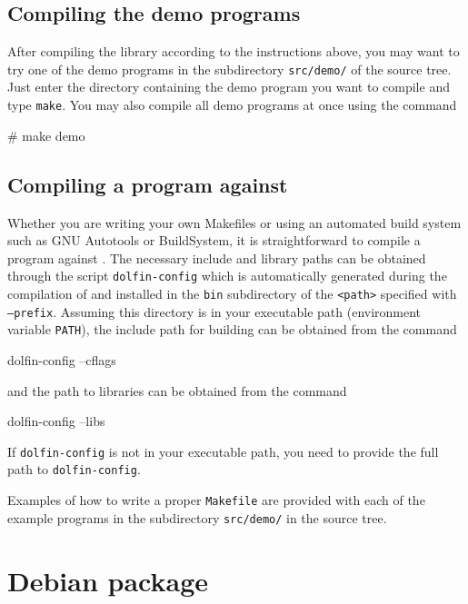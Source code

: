 \subsection{Compiling the demo programs}

After compiling the \dolfin{} library according to the instructions
above, you may want to try one of the demo programs in the
subdirectory \texttt{src/demo/} of the \dolfin{} source tree.
Just enter the directory containing the demo program you want to
compile and type \texttt{make}. You may also compile all demo programs
at once using the command
\begin{code}
  # make demo
\end{code}

\subsection{Compiling a program against \dolfin{}}

Whether you are writing your own Makefiles or using an automated build
system such as GNU Autotools or BuildSystem, it is straightforward to
compile a program against \dolfin{}. The necessary include and library
paths can be obtained through the script \texttt{dolfin-config} which
is automatically generated during the compilation of \dolfin{} and
installed in the \texttt{bin} subdirectory of the \texttt{<path>}
specified with \texttt{--prefix}. Assuming this directory is in your
executable path (environment variable \texttt{PATH}), the include
path for building \dolfin{} can be obtained from the command
\begin{code}
  dolfin-config --cflags
\end{code}
and the path to \dolfin{} libraries can be obtained from the command
\begin{code}
  dolfin-config --libs
\end{code}
If \texttt{dolfin-config} is not in your executable path, you need to
provide the full path to \texttt{dolfin-config}.

Examples of how to write a proper \texttt{Makefile} are provided with
each of the example programs in the subdirectory \texttt{src/demo/} in
the \dolfin{} source tree.

\section{Debian package}

